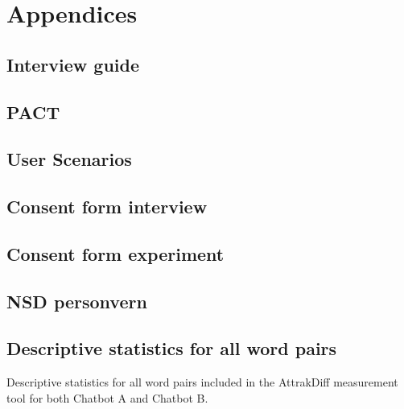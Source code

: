 \chapter{Appendices}

\section{Interview guide}

\section{PACT}

\section{User Scenarios}

\section{Consent form interview}

\section{Consent form experiment}

\section{NSD personvern}

\section{Descriptive statistics for all word pairs}
Descriptive statistics for all word pairs included in the AttrakDiff measurement tool for both Chatbot A and Chatbot B.


